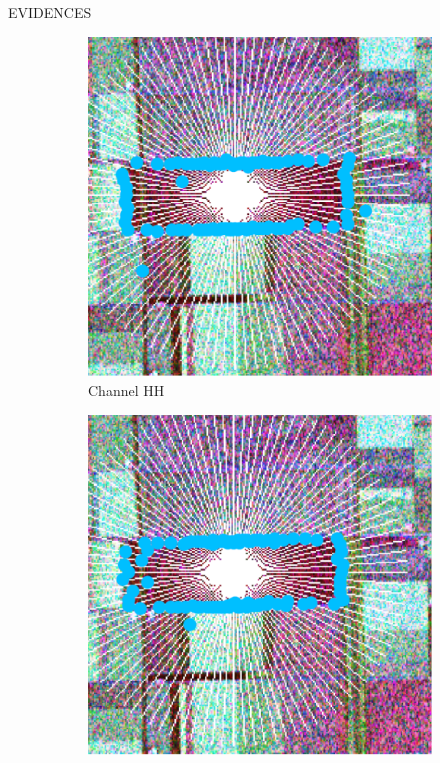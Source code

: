 \documentclass[final]{beamer}
\newlength{\onecolwid}
\newlength{\threecolwid}
\begin{document}
\begin{frame}[t]
\begin{columns}[t,totalwidth=\threecolwid]
\begin{column}{\onecolwid}
\begin{block}{\LARGE{EVIDENCES}}
\vspace{0.7em}

\begin{figure}[hbt]

	\captionsetup[subfigure]{labelformat=empty}
    \begin{subfigure}{0.32\linewidth}
		    \centering
    \includegraphics[width=\linewidth]{figures/hh_f.pdf}
    \caption{\large{Channel HH}}
  \end{subfigure}
  \begin{subfigure}{0.32\linewidth}
    \centering
    \includegraphics[width=\linewidth]{figures/hv.pdf}

\end{subfigure}
\end{figure}
\end{block}
\end{column}
\end{columns}
\end{frame}
\end{document}
